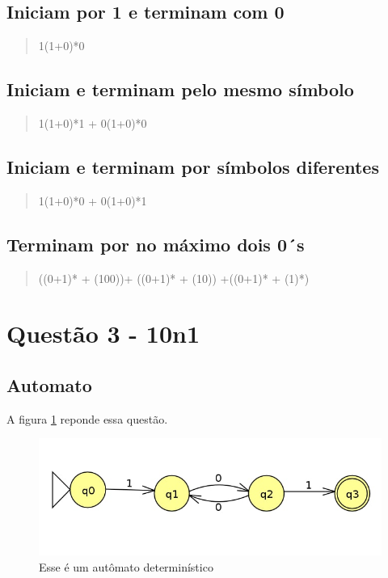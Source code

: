 \documentclass[11pt]{article}
\begin{document}
\subsection{Iniciam por 1 e terminam com 0}
\label{sec:orgebbe317}

\begin{quote}
1(1+0)*0 
\end{quote}

\subsection{Iniciam e terminam pelo mesmo símbolo}
\label{sec:org767b4d3}

\begin{quote}
1(1+0)*1 + 0(1+0)*0 
\end{quote}

\subsection{Iniciam e terminam por símbolos diferentes}
\label{sec:orgfe30711}

\begin{quote}
1(1+0)*0 + 0(1+0)*1 
\end{quote}

\subsection{Terminam por no máximo dois 0´s}
\label{sec:org0ddd53c}
\begin{quote}
((0+1)* + (100))+ ((0+1)* + (10)) +((0+1)* + (1)*)
\end{quote}
\section{Questão 3 - 10n1}
\label{sec:org8ef6293}
\subsection{Automato}
\label{sec:org6cd069b}
A figura \ref{fig:org7ba182c} reponde essa questão. 

\begin{figure}[htbp]
\centering
\includegraphics[width=.9\linewidth]{./q3/q3.jpg}
\caption{\label{fig:org7ba182c}
Esse é um autômato determinístico}
\end{figure}
\end{document}
